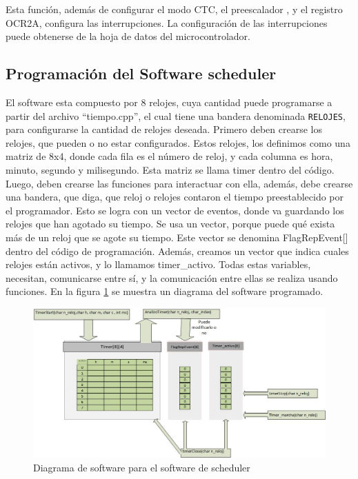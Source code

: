 Esta función, además de configurar el modo CTC, el preescalador , y el registro OCR2A, configura las interrupciones. La configuración de las interrupciones puede obtenerse de la hoja de datos del microcontrolador.

\subsection{Programación del Software scheduler} 

El software esta compuesto por 8 relojes, cuya cantidad puede programarse a partir del archivo ``tiempo.cpp'', el cual tiene una bandera denominada \texttt{RELOJES}, para configurarse la cantidad de relojes deseada. 
Primero deben crearse los relojes, que pueden o no estar configurados. Estos relojes, los definimos como una matriz de 8x4, donde cada fila es el número de reloj, y cada columna es hora, minuto, segundo y milisegundo. Esta matriz se llama timer dentro del código. Luego, deben crearse las funciones para interactuar con ella, además,  debe crearse una bandera, que diga, que reloj o relojes contaron el tiempo preestablecido por el programador. Esto se logra con un vector de eventos, donde va guardando los relojes que han agotado su tiempo. Se usa un vector, porque puede qué exista más de un reloj que se agote su tiempo. Este vector se denomina FlagRepEvent[] dentro del código de programación. Además, creamos un vector que indica cuales relojes están activos, y lo llamamos timer\_activo. Todas estas variables, necesitan, comunicarse entre sí, y la comunicación entre ellas se realiza usando funciones. En la figura \ref{fig:soft_sch} se muestra un diagrama del software programado.  


\begin{figure}[ht]
	\includegraphics[width=\linewidth]{software_timer} 
	\caption{Diagrama de software para el software de scheduler}
	\label{fig:soft_sch} 	
\end{figure}

